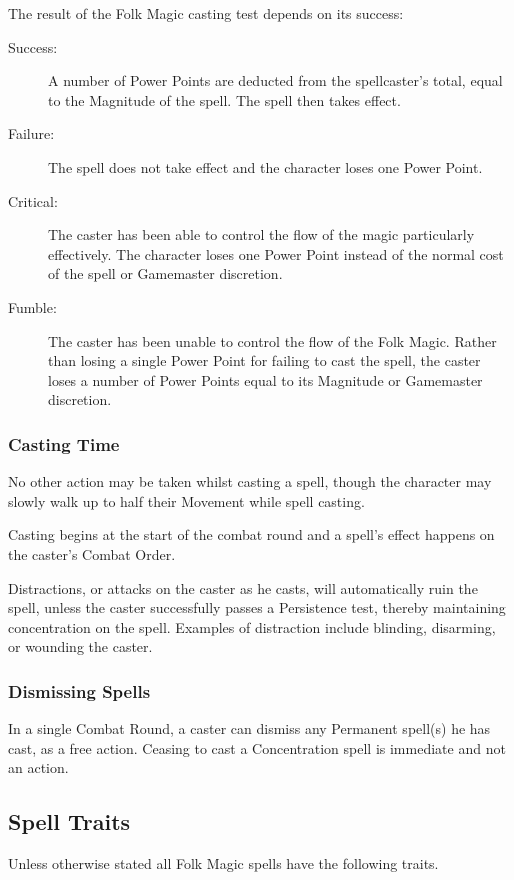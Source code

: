 The result of the Folk Magic casting test depends on its success:
\begin{description}
	\item[Success:] A number of Power Points are deducted from the spellcaster’s total, equal to the Magnitude of the spell. The spell then takes effect.
	\item[Failure:] The spell does not take effect and the character loses one Power Point.
  \item[Critical:] The caster has been able to control the flow of the magic particularly effectively. The character loses one Power Point instead of the normal cost of the spell or Gamemaster discretion.
	\item[Fumble:] The caster has been unable to control the flow of the Folk Magic. Rather than losing a single Power Point for failing to cast the spell, the caster loses a number of Power Points equal to its Magnitude or Gamemaster discretion. 
\end{description}



\subsubsection{Casting Time}
No other action may be taken whilst casting a spell, though the character may slowly walk up to half their Movement while spell casting. %

Casting begins at the start of the combat round and a spell’s effect happens on the caster’s Combat Order.%

Distractions, or attacks on the caster as he casts, will automatically ruin the spell, unless the caster successfully passes a Persistence test, thereby maintaining concentration on the spell. Examples of distraction include blinding, disarming, or wounding the caster.

\subsubsection{Dismissing Spells}
In a single Combat Round, a caster can dismiss any Permanent spell(s) he has cast, as a free action. Ceasing to cast a Concentration spell is immediate and not an action. 


\subsection{Spell Traits}
Unless otherwise stated all Folk Magic spells have the following traits.

